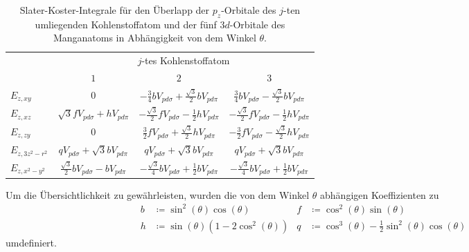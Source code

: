 \begin{table}
    \centering
    \caption{Slater-Koster-Integrale für den Überlapp der $p_z$-Orbitale des $j$-ten umliegenden
    Kohlenstoffatom und der fünf $3d$-Orbitale des Manganatoms in Abhängigkeit von dem Winkel $\theta$.}
    \label{tab:slaterkosters}
    \begin{tabular}{l c c c}
    & \multicolumn{3}{c}{$j$-tes Kohlenstoffatom}\\
    \cmidrule(lr){2-4}
    & {$1$} & {$2$} & {$3$} \\
    \midrule
    {$E_{z,xy}$      }  & {$0$}                                               & {$-\frac{3}{4}bV_{pd\sigma} + \frac{\sqrt{3}}{2}bV_{pd\pi}$}          & {$ \frac{3}{4}bV_{pd\sigma}-\frac{\sqrt{3}}{2}bV_{pd\pi}$}         \vspace{0.5cm} \\ 
    {$E_{z,xz}$      }  & {$\sqrt{3}fV_{pd\sigma} + hV_{pd\pi}$}              & {$-\frac{\sqrt{3}}{2}fV_{pd\sigma} - \frac{1}{2} hV_{pd\pi}$}         & {$-\frac{\sqrt{3}}{2}fV_{pd\sigma} - \frac{1}{2} hV_{pd\pi}$}      \vspace{0.5cm} \\
    {$E_{z,zy}$      }  & {$0$}                                               & {$ \frac{3}{2}fV_{pd\sigma}+\frac{\sqrt{3}}{2} hV_{pd\pi}$}           & {$-\frac{3}{2}fV_{pd\sigma}-\frac{\sqrt{3}}{2} hV_{pd\pi}$}        \vspace{0.5cm} \\
    {$E_{z,3z^2-r^2}$}  & {$q V_{pd\sigma}+\sqrt{3}bV_{pd\pi}$}               & {$q V_{pd\sigma}+\sqrt{3}bV_{pd\pi}$}                                 & {$q V_{pd\sigma}+\sqrt{3}bV_{pd\pi}$} \vspace{0.5cm} \\
    {$E_{z,x^2-y^2}$ }  & {$\frac{\sqrt{3}}{2}bV_{pd\sigma}-bV_{pd\pi}$}      & {$-\frac{\sqrt{3}}{4}bV_{pd\sigma}+\frac{1}{2}bV_{pd\pi}$}           & {$-\frac{\sqrt{3}}{4}bV_{pd\sigma}+\frac{1}{2}bV_{pd\pi}$}                       \\ 
    \bottomrule
    \end{tabular}
  \end{table}
Um die Übersichtlichkeit zu gewährleisten, wurden die von dem Winkel $\theta$ abhängigen Koeffizienten zu
\begin{align*}
b & \coloneq \sin^2(\theta) \cos(\theta)        & f &  \coloneq \cos^2(\theta) \sin(\theta)                             \\                     
h & \coloneq \sin(\theta)(1-2\cos^2(\theta))    & q &  \coloneq \cos^3(\theta) - \frac{1}{2}\sin^2(\theta) \cos(\theta)
\end{align*}
umdefiniert.
